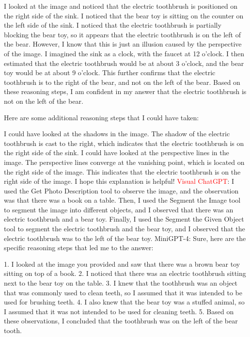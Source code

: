 \begin{enumerate}
        I looked at the image and noticed that the electric toothbrush is positioned on the right side of the sink.
        I noticed that the bear toy is sitting on the counter on the left side of the sink.
        I noticed that the electric toothbrush is partially blocking the bear toy, so it appears that the electric toothbrush is on the left of the bear. However, I know that this is just an illusion caused by the perspective of the image.
        I imagined the sink as a clock, with the faucet at 12 o'clock. I then estimated that the electric toothbrush would be at about 3 o'clock, and the bear toy would be at about 9 o'clock. This further confirms that the electric toothbrush is to the right of the bear, and not on the left of the bear.
        Based on these reasoning steps, I am confident in my answer that the electric toothbrush is not on the left of the bear.
        
        Here are some additional reasoning steps that I could have taken:
        
        I could have looked at the shadows in the image. The shadow of the electric toothbrush is cast to the right, which indicates that the electric toothbrush is on the right side of the sink.
        I could have looked at the perspective lines in the image. The perspective lines converge at the vanishing point, which is located on the right side of the image. This indicates that the electric toothbrush is on the right side of the image.
        I hope this explanation is helpful!
        \subitem \textcolor{red}{Visual ChatGPT}: I used the Get Photo Description tool to observe the image, and the observation was that there was a book on a table. Then, I used the Segment the Image tool to segment the image into different objects, and I observed that there was an electric toothbrush and a bear toy. Finally, I used the Segment the Given Object tool to segment the electric toothbrush and the bear toy, and I observed that the electric toothbrush was to the left of the bear toy.
        \subitem MiniGPT-4: Sure, here are the specific reasoning steps that led me to the answer:

        1. I looked at the image you provided and saw that there was a brown bear toy sitting on top of a book.
        2. I noticed that there was an electric toothbrush sitting next to the bear toy on the table.
        3. I knew that the toothbrush was an object that was commonly used to clean teeth, so I assumed that it was intended to be used for brushing teeth.
        4. I also knew that the bear toy was a stuffed animal, so I assumed that it was not intended to be used for cleaning teeth.
        5. Based on these observations, I concluded that the toothbrush was on the left of the bear tooth.
    \end{enumerate}
